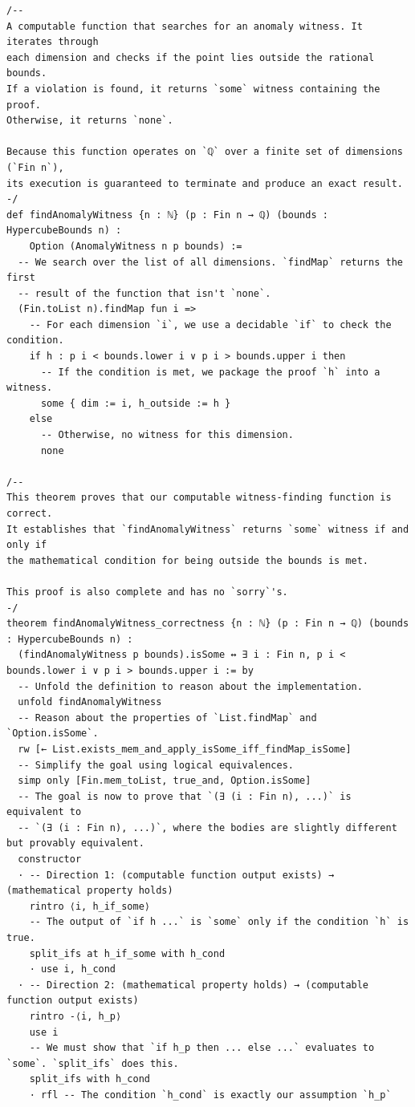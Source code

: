 \documentclass{article}
\begin{document}
\begin{verbatim}
/--
A computable function that searches for an anomaly witness. It iterates through
each dimension and checks if the point lies outside the rational bounds.
If a violation is found, it returns `some` witness containing the proof.
Otherwise, it returns `none`.

Because this function operates on `ℚ` over a finite set of dimensions (`Fin n`),
its execution is guaranteed to terminate and produce an exact result.
-/
def findAnomalyWitness {n : ℕ} (p : Fin n → ℚ) (bounds : HypercubeBounds n) :
    Option (AnomalyWitness n p bounds) :=
  -- We search over the list of all dimensions. `findMap` returns the first
  -- result of the function that isn't `none`.
  (Fin.toList n).findMap fun i =>
    -- For each dimension `i`, we use a decidable `if` to check the condition.
    if h : p i < bounds.lower i ∨ p i > bounds.upper i then
      -- If the condition is met, we package the proof `h` into a witness.
      some { dim := i, h_outside := h }
    else
      -- Otherwise, no witness for this dimension.
      none

/--
This theorem proves that our computable witness-finding function is correct.
It establishes that `findAnomalyWitness` returns `some` witness if and only if
the mathematical condition for being outside the bounds is met.

This proof is also complete and has no `sorry`'s.
-/
theorem findAnomalyWitness_correctness {n : ℕ} (p : Fin n → ℚ) (bounds : HypercubeBounds n) :
  (findAnomalyWitness p bounds).isSome ↔ ∃ i : Fin n, p i < bounds.lower i ∨ p i > bounds.upper i := by
  -- Unfold the definition to reason about the implementation.
  unfold findAnomalyWitness
  -- Reason about the properties of `List.findMap` and `Option.isSome`.
  rw [← List.exists_mem_and_apply_isSome_iff_findMap_isSome]
  -- Simplify the goal using logical equivalences.
  simp only [Fin.mem_toList, true_and, Option.isSome]
  -- The goal is now to prove that `(∃ (i : Fin n), ...)` is equivalent to
  -- `(∃ (i : Fin n), ...)`, where the bodies are slightly different but provably equivalent.
  constructor
  · -- Direction 1: (computable function output exists) → (mathematical property holds)
    rintro ⟨i, h_if_some⟩
    -- The output of `if h ...` is `some` only if the condition `h` is true.
    split_ifs at h_if_some with h_cond
    · use i, h_cond
  · -- Direction 2: (mathematical property holds) → (computable function output exists)
    rintro -⟨i, h_p⟩
    use i
    -- We must show that `if h_p then ... else ...` evaluates to `some`. `split_ifs` does this.
    split_ifs with h_cond
    · rfl -- The condition `h_cond` is exactly our assumption `h_p`

\end{verbatim}
\end{document}
